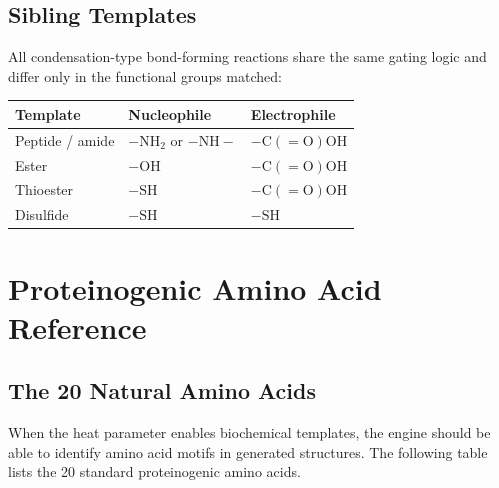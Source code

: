 \documentclass[11pt]{article}
\begin{document}
\subsection{Sibling Templates}

All condensation-type bond-forming reactions share the same gating logic
and differ only in the functional groups matched:

\begin{center}
\begin{tabular}{lll}
\toprule
Template & Nucleophile & Electrophile \\
\midrule
Peptide / amide & $\mathrm{-NH_2}$ or $\mathrm{-NH-}$ & $\mathrm{-C(=O)OH}$ \\
Ester & $\mathrm{-OH}$ & $\mathrm{-C(=O)OH}$ \\
Thioester & $\mathrm{-SH}$ & $\mathrm{-C(=O)OH}$ \\
Disulfide & $\mathrm{-SH}$ & $\mathrm{-SH}$ \\
\bottomrule
\end{tabular}
\end{center}

\section{Proteinogenic Amino Acid Reference}

\subsection{The 20 Natural Amino Acids}

When the heat parameter enables biochemical templates, the engine should
be able to identify amino acid motifs in generated structures.  The
following table lists the 20 standard proteinogenic amino acids.
\end{document}
